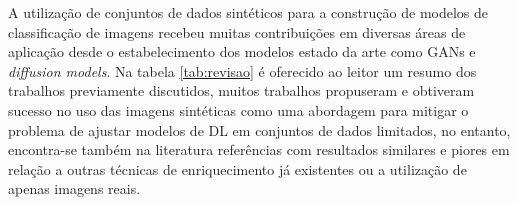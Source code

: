 A utilização de conjuntos de dados sintéticos para a construção de modelos de classificação de imagens recebeu muitas contribuições em diversas áreas de aplicação desde o estabelecimento dos modelos estado da arte como GANs e \textit{diffusion models}.
Na tabela \ref{tab:revisao} é oferecido ao leitor um resumo dos trabalhos previamente discutidos, muitos trabalhos propuseram e obtiveram sucesso no uso das imagens sintéticas como uma abordagem para mitigar o problema de ajustar modelos de DL em conjuntos de dados limitados, no entanto, encontra-se também na literatura referências com resultados similares \cite{xieGANBasedSubInstanceAugmentation2024} e piores \cite{ivanovsSyntheticImageGeneration2023}\cite{deptoQuantifyingImbalancedClassification2023a} \cite{masengiInvestigatingDeepLearning2023} em relação a outras técnicas de enriquecimento já existentes ou a utilização de apenas imagens reais.

